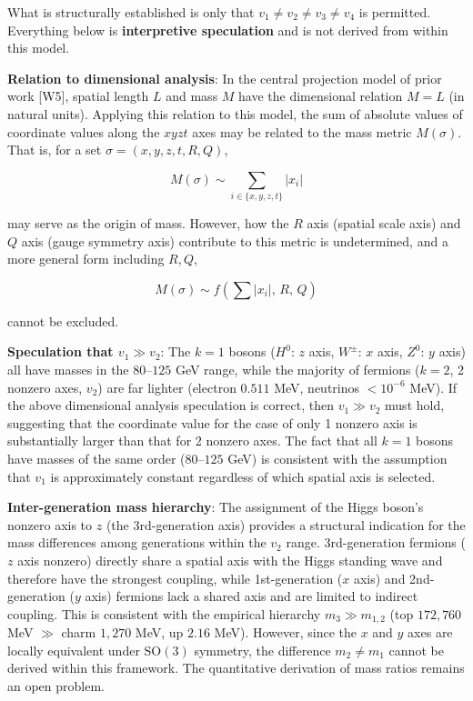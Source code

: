 \documentclass[
  a4paper,11pt]{article}
\theoremstyle{definition}
\theoremstyle{remark}
\begin{document}
What is structurally established is only that
\(v_1 \neq v_2 \neq v_3 \neq v_4\) is permitted. Everything below is
\textbf{interpretive speculation} and is not derived from within this
model.

\textbf{Relation to dimensional analysis}: In the central projection
model of prior work {[}W5{]}, spatial length \(L\) and mass \(M\) have
the dimensional relation \(M = L\) (in natural units). Applying this
relation to this model, the sum of absolute values of coordinate values
along the \(xyzt\) axes may be related to the mass metric \(M(\sigma)\).
That is, for a set \(\sigma = (x, y, z, t, R, Q)\),

\[M(\sigma) \sim \sum_{i \in \{x, y, z, t\}} |x_i|\]

may serve as the origin of mass. However, how the \(R\) axis (spatial
scale axis) and \(Q\) axis (gauge symmetry axis) contribute to this
metric is undetermined, and a more general form including \(R, Q\),

\[M(\sigma) \sim f\!\left(\sum |x_i|,\, R,\, Q\right)\]

cannot be excluded.

\textbf{Speculation that \(v_1 \gg v_2\)}: The \(k = 1\) bosons
(\(H^0\): \(z\) axis, \(W^\pm\): \(x\) axis, \(Z^0\): \(y\) axis) all
have masses in the \(80\)--\(125\) GeV range, while the majority of
fermions (\(k = 2\), 2 nonzero axes, \(v_2\)) are far lighter (electron
\(0.511\) MeV, neutrinos \(< 10^{-6}\) MeV). If the above dimensional
analysis speculation is correct, then \(v_1 \gg v_2\) must hold,
suggesting that the coordinate value for the case of only 1 nonzero axis
is substantially larger than that for 2 nonzero axes. The fact that all
\(k = 1\) bosons have masses of the same order (\(80\)--\(125\) GeV) is
consistent with the assumption that \(v_1\) is approximately constant
regardless of which spatial axis is selected.

\textbf{Inter-generation mass hierarchy}: The assignment of the Higgs
boson's nonzero axis to \(z\) (the 3rd-generation axis) provides a
structural indication for the mass differences among generations within
the \(v_2\) range. 3rd-generation fermions (\(z\) axis nonzero) directly
share a spatial axis with the Higgs standing wave and therefore have the
strongest coupling, while 1st-generation (\(x\) axis) and 2nd-generation
(\(y\) axis) fermions lack a shared axis and are limited to indirect
coupling. This is consistent with the empirical hierarchy
\(m_3 \gg m_{1,2}\) (top \(172{,}760\) MeV \(\gg\) charm \(1{,}270\)
MeV, up \(2.16\) MeV). However, since the \(x\) and \(y\) axes are
locally equivalent under \(\mathrm{SO}(3)\) symmetry, the difference
\(m_2 \neq m_1\) cannot be derived within this framework. The
quantitative derivation of mass ratios remains an open problem.
\end{document}
